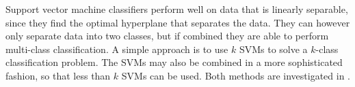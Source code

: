 Support vector machine classifiers perform well on data that is linearly separable, since they find the optimal hyperplane that separates the data. They can however only separate data into two classes, but if combined they are able to perform multi-class classification. A simple approach is to use $k$ SVMs to solve a $k$-class classification problem. The SVMs may also be combined in a more sophisticated fashion, so that less than $k$ SVMs can be used. Both methods are investigated in \cite{Mayoras99SVM}.
